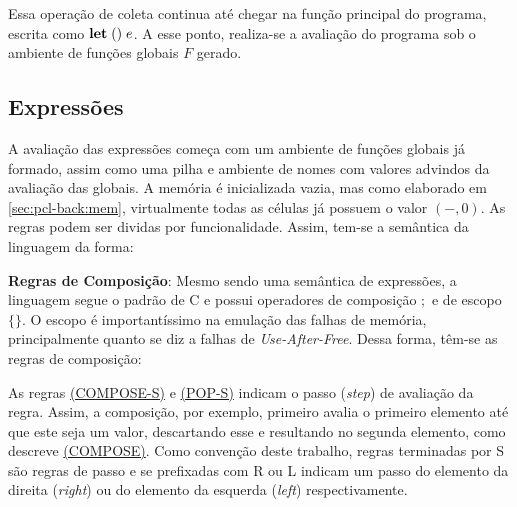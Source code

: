 Essa operação de coleta continua até chegar na função principal do programa, escrita como $\mathbf{let}\;()\; e$. A esse ponto, realiza-se a avaliação do programa sob o ambiente de funções globais $F$ gerado. 

\subsection{Expressões}

A avaliação das expressões começa com um ambiente de funções globais já formado, assim como uma pilha e ambiente de nomes com valores advindos da avaliação das globais. A memória é inicializada vazia, mas como elaborado em \ref{sec:pcl-back:mem}, virtualmente todas as células já possuem o valor $(-, 0)$.  As regras podem ser dividas por funcionalidade. Assim, tem-se a semântica da linguagem da forma:

\textbf{Regras de Composição}: Mesmo sendo uma semântica de expressões, a linguagem segue o padrão de C e possui operadores de composição $;$ e de escopo $\{\}$. O escopo é importantíssimo na emulação das falhas de memória, principalmente quanto se diz a falhas de \emph{Use-After-Free}. Dessa forma, têm-se as regras de composição:






As regras \hyperref[rule:pop-s]{(COMPOSE-S)} e \hyperref[rule:compose-s]{(POP-S)} indicam o passo (\emph{step}) de avaliação da regra. Assim, a composição, por exemplo, primeiro avalia o primeiro elemento até que este seja um valor, descartando esse e resultando no segunda elemento, como descreve \hyperref[rule:compose]{(COMPOSE)}. Como convenção deste trabalho, regras terminadas por S são regras de passo e se prefixadas com R ou L indicam um passo do elemento da direita (\emph{right}) ou do elemento da esquerda (\emph{left}) respectivamente.

